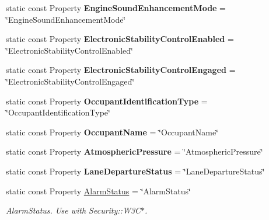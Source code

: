\begin{DoxyCompactItemize}
\item 
\hypertarget{classVehicleProperty_a64889d2e6f178a723c7e8849e72f0217}{static const Property {\bfseries Engine\+Sound\+Enhancement\+Mode} = \char`\"{}Engine\+Sound\+Enhancement\+Mode\char`\"{}}\label{classVehicleProperty_a64889d2e6f178a723c7e8849e72f0217}

\item 
\hypertarget{classVehicleProperty_a5c1501304774a506b15a27ad18025be7}{static const Property {\bfseries Electronic\+Stability\+Control\+Enabled} = \char`\"{}Electronic\+Stability\+Control\+Enabled\char`\"{}}\label{classVehicleProperty_a5c1501304774a506b15a27ad18025be7}

\item 
\hypertarget{classVehicleProperty_aae953fcb2c8a1d1affff31f030bf4710}{static const Property {\bfseries Electronic\+Stability\+Control\+Engaged} = \char`\"{}Electronic\+Stability\+Control\+Engaged\char`\"{}}\label{classVehicleProperty_aae953fcb2c8a1d1affff31f030bf4710}

\item 
\hypertarget{classVehicleProperty_af4ca8d01ac56061dc917ea087124d931}{static const Property {\bfseries Occupant\+Identification\+Type} = \char`\"{}Occupant\+Identification\+Type\char`\"{}}\label{classVehicleProperty_af4ca8d01ac56061dc917ea087124d931}

\item 
\hypertarget{classVehicleProperty_ab5cef2bec31e06d2a47508490dfa8ef0}{static const Property {\bfseries Occupant\+Name} = \char`\"{}Occupant\+Name\char`\"{}}\label{classVehicleProperty_ab5cef2bec31e06d2a47508490dfa8ef0}

\item 
\hypertarget{classVehicleProperty_a572e98778e596728ec6bc827a659fb23}{static const Property {\bfseries Atmospheric\+Pressure} = \char`\"{}Atmospheric\+Pressure\char`\"{}}\label{classVehicleProperty_a572e98778e596728ec6bc827a659fb23}

\item 
\hypertarget{classVehicleProperty_ab43c580366c1f12ff2278833e2955b50}{static const Property {\bfseries Lane\+Departure\+Status} = \char`\"{}Lane\+Departure\+Status\char`\"{}}\label{classVehicleProperty_ab43c580366c1f12ff2278833e2955b50}

\item 
\hypertarget{classVehicleProperty_aaef7ce073f0c9efbe7d3beceb0ce4e4f}{static const Property \hyperlink{classVehicleProperty_aaef7ce073f0c9efbe7d3beceb0ce4e4f}{Alarm\+Status} = \char`\"{}Alarm\+Status\char`\"{}}\label{classVehicleProperty_aaef7ce073f0c9efbe7d3beceb0ce4e4f}

\begin{DoxyCompactList}\small\item\em Alarm\+Status. Use with Security\+::\+W3\+C$\ast$. \end{DoxyCompactList}\end{DoxyCompactItemize}


